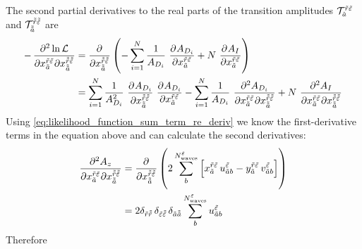 The second partial derivatives \wrt to the real parts of the
transition amplitudes
$\mathcal{T}_{\tilde{a}}^{\tilde{r} \tilde{\varepsilon}}$ and
$\mathcal{T}_{\tilde{\tilde{a}}}^{\tilde{\tilde{r}} \tilde{\tilde{\varepsilon}}}$
are
\begin{align}
  -\dmd{\ln \mathcal{L}}{2}{{x_{\tilde{a}}^{\tilde{r} \tilde{\refl}}}}{}{{x_{\doubletilde{a}}^{\doubletilde{r} \doubletilde{\refl}}}}{}
  &= \dpd{}{{x_{\doubletilde{a}}^{\doubletilde{r} \doubletilde{\refl}}}}
    \rBrk{-\sum_{i = 1}^{N} \frac{1}{A_{D_i}}\, \dpd{A_{D_i}}{{x_{\tilde{a}}^{\tilde{r} \tilde{\refl}}}} + N\, \dpd{A_I}{{x_{\tilde{a}}^{\tilde{r} \tilde{\refl}}}}} \\
  &= \sum_{i = 1}^{N} \frac{1}{A_{D_i}^2}\, \dpd{A_{D_i}}{{x_{\doubletilde{a}}^{\doubletilde{r} \doubletilde{\refl}}}}\, \dpd{A_{D_i}}{{x_{\tilde{a}}^{\tilde{r} \tilde{\refl}}}}
    - \sum_{i = 1}^{N} \frac{1}{A_{D_i}}\, \dmd{A_{D_i}}{2}{{x_{\tilde{a}}^{\tilde{r} \tilde{\refl}}}}{}{{x_{\doubletilde{a}}^{\doubletilde{r} \doubletilde{\refl}}}}{}
    + N\, \dmd{A_I}{2}{{x_{\tilde{a}}^{\tilde{r} \tilde{\refl}}}}{}{{x_{\doubletilde{a}}^{\doubletilde{r} \doubletilde{\refl}}}}{}
\end{align}
Using \cref{eq:likelihood_function_sum_term_re_deriv} we know the
first-derivative terms in the equation above and can calculate the
second derivatives:
\begin{align}
  \label{eq:likelihood_function_sum_term_re_re_deriv}
  \dmd{A_z}{2}{{x_{\tilde{a}}^{\tilde{r} \tilde{\refl}}}}{}{{x_{\doubletilde{a}}^{\doubletilde{r} \doubletilde{\refl}}}}{}
  &= \dpd{}{{x_{\doubletilde{a}}^{\doubletilde{r} \doubletilde{\refl}}}}
    \rBrk{2 \sum_b^{N^{\tilde{\refl}}_\text{waves}} \sBrk{x_{\tilde{a}}^{\tilde{r} \tilde{\refl}}\, u^{\tilde{\refl}}_{\tilde{a} b}
    - y_{\tilde{a}}^{\tilde{r} \tilde{\refl}}\, v^{\tilde{\refl}}_{\tilde{a} b}}} \\
  \label{eq:likelihood_function_sum_term_re_re_deriv}
  &= 2 \delta_{\tilde{r} \doubletilde{r}}\, \delta_{\tilde{\refl} \doubletilde{\refl}}\, \delta_{\tilde{a} \doubletilde{a}}
    \sum_b^{N^{\tilde{\refl}}_\text{waves}} u^{\tilde{\refl}}_{\tilde{a} b}
\end{align}
Therefore
